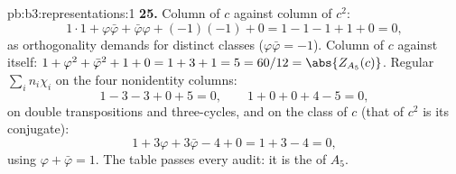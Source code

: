 \begin{solution}{pb:b3:representations:1}
\textbf{25.} Column of $c$ against column of $c^2$:
\[
1\cdot1 + \varphi\bar\varphi + \bar\varphi\varphi +
(-1)(-1) + 0 = 1 - 1 - 1 + 1 + 0 = 0,
\]
as orthogonality demands for distinct classes ($\varphi
\bar\varphi = -1$). Column of $c$ against itself: $1 +
\varphi^2 + \bar\varphi^2 + 1 + 0 = 1 + 3 + 1 = 5 = 60/12 =
\abs{Z_{A_5}(c)}$. Regular  $\sum_in_i\chi_i$ on the
four nonidentity columns:
\[
1 - 3 - 3 + 0 + 5 = 0, \qquad
1 + 0 + 0 + 4 - 5 = 0,
\]
on double transpositions and three-cycles, and on the class
of $c$ (that of $c^2$ is its  conjugate):
\[
1 + 3\varphi + 3\bar\varphi - 4 + 0 = 1 + 3 - 4 = 0,
\]
using $\varphi + \bar\varphi = 1$. The table passes every
audit: it is the  of $A_5$.
\end{solution}
